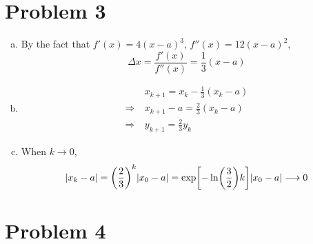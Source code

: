 \documentclass{article}
\begin{document}
\section*{Problem 3}
\begin{enumerate}[(a)]
	\item By the fact that $f'(x)=4(x-a)^3$, $f''(x)=12(x-a)^2$, 
		$$
		\Delta x = 
		\frac{f'(x)}{f''(x)}=\frac{1}{3}(x-a)
		$$
	\item
		$$
		\begin{aligned}
			&
			x_{k+1}=x_k-\frac{1}{3}(x_k-a)
			\\ \Longrightarrow\ &
			x_{k+1}-a=\frac{2}{3}(x_k-a)
			\\ \Longrightarrow\ &
			y_{k+1}=\frac{2}{3}y_k
		\end{aligned}
		$$
	\item
		When $k\to0$,
		$$
		\abs{x_k-a}=\qty(\frac{2}{3})^k\abs{x_0-a}=\exp[-\ln(\frac{3}{2})k]\abs{x_0-a}\longrightarrow 0
		$$
\end{enumerate}

\section*{Problem 4}
\end{document}
